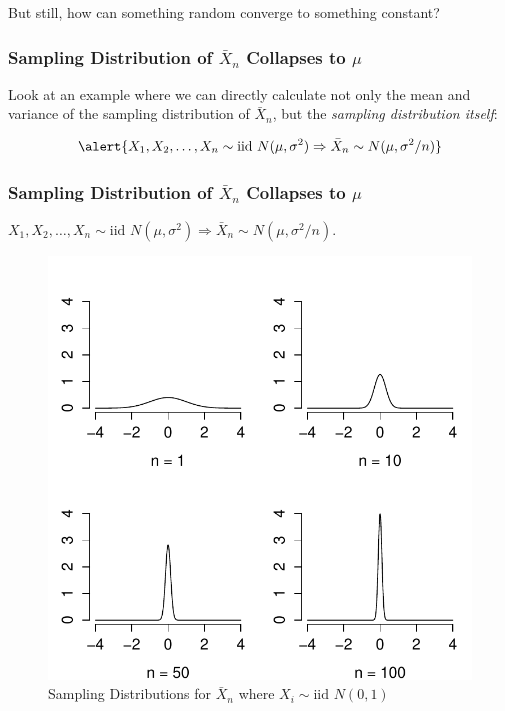 \documentclass[handout]{beamer}
\begin{document}
\begin{frame}
\huge\begin{center} But still, how can something random converge to something constant? \end{center}
\end{frame}

\begin{frame}
\frametitle{Sampling Distribution of $\bar{X}_n$ Collapses to $\mu$}
Look at an example where we can directly calculate not only the mean and variance of the sampling distribution of $\bar{X}_n$, but the \emph{sampling distribution itself}:

\vspace{1em}
$$\alert{X_1, X_2, \hdots, X_n \sim \mbox{iid } N(\mu,\sigma^2) \Rightarrow \bar{X}_n \sim N(\mu, \sigma^2/n)}$$


\end{frame}






\begin{frame}
\frametitle{Sampling Distribution of $\bar{X}_n$ Collapses to $\mu$}
\alert{$X_1, X_2, \hdots, X_n \sim \mbox{iid } N(\mu,\sigma^2) \Rightarrow \bar{X}_n \sim N(\mu, \sigma^2/n)$.} \\
\begin{figure}
\centering
\includegraphics[scale = 0.5]{./images/normal_LLN_dist}
\caption{Sampling Distributions for $\bar{X}_n$ where $X_i \sim \mbox{iid } N(0,1)$}
\end{figure}

\end{frame}
\end{document}
